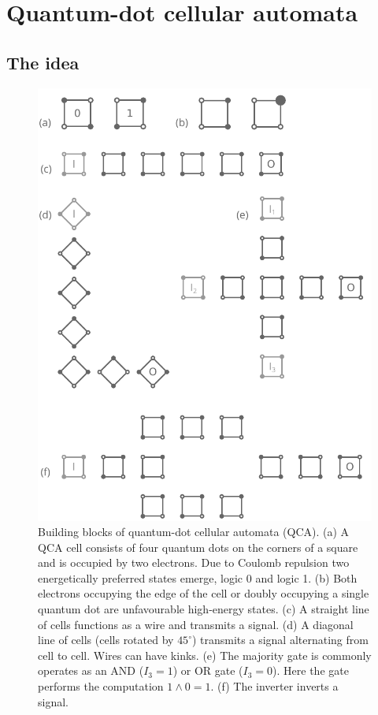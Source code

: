 \chapter{Quantum-dot cellular automata}
\graphicspath{{../gfx/chapter01/}}


\section{The idea}

\begin{figure}
  \center
  \includegraphics{intro_qca}
  \caption{
Building blocks of quantum-dot cellular automata (QCA). (a) A QCA cell consists
of four quantum dots on the corners of a square and is occupied by two
electrons. Due to Coulomb repulsion two energetically preferred states emerge,
logic 0 and logic 1. (b) Both electrons occupying the edge of the cell or
doubly occupying a single quantum dot are unfavourable high-energy states. (c) A
straight line of cells functions as a wire and transmits a signal.  (d) A
diagonal line of cells (cells rotated by $45^{\circ}$) transmits a signal
alternating from cell to cell. Wires can have kinks. (e) The majority gate is
commonly operates as an AND ($I_3 = 1$) or OR gate ($I_3 = 0$). Here the gate
performs the computation $1 \land 0 = 1$. (f) The inverter inverts a signal.
}
  \label{fig:intro_qca}
\end{figure}

